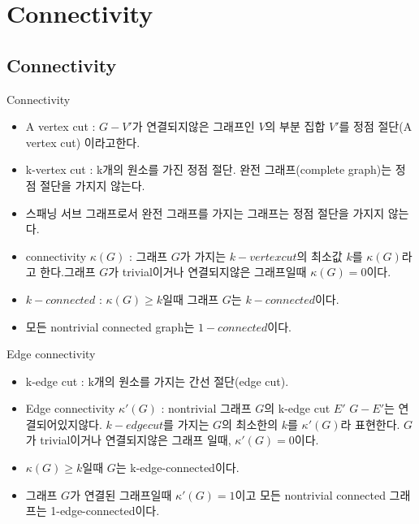\section{Connectivity}

\subsection{Connectivity}

\begin{dfn}[Connectivity] 
    Connectivity
    \begin{itemize}
        \item A vertex cut : $G-V'$가 연결되지않은 그래프인 $V$의 부분 집합 $V'$를 정점 절단(A vertex cut) 이라고한다.
        \item k-vertex cut : k개의 원소를 가진 정점 절단. 완전 그래프(complete graph)는 정점 절단을 가지지 않는다.
        \item 스패닝 서브 그래프로서 완전 그래프를 가지는 그래프는 정점 절단을 가지지 않는다.
        \item  connectivity $\kappa(G)$ : 그래프 $G$가 가지는 $k-vertex cut$의 최소값 $k$를 $\kappa(G)$라고 한다.그래프 $G$가 trivial이거나 연결되지않은 그래프일때 $\kappa(G) = 0$이다.
        \item $k-connected$ :  $\kappa(G) \ge k$일때 그래프 $G$는 $k-connected$이다. 
        \item 모든 nontrivial connected graph는 $1-connected$이다.
    \end{itemize}
\end{dfn}

\begin{dfn}
    Edge connectivity 
    \begin{itemize}
        \item k-edge cut : k개의 원소를 가지는 간선 절단(edge cut).
        \item Edge connectivity $\kappa'(G)$ : nontrivial 그래프 $G$의 k-edge cut $E'$ $G-E'$는 연결되어있지않다. $k-edge cut$를 가지는 $G$의 최소한의 $k$를 $\kappa'(G)$라 표현한다. $G$가 trivial이거나 연결되지않은 그래프 일때, $\kappa'(G) = 0$이다.
        \item $\kappa(G) \ge k$일때 $G$는 k-edge-connected이다.
        \item 그래프 $G$가 연결된 그래프일때  $\kappa'(G)= 1$이고 모든 nontrivial connected 그래프는 1-edge-connected이다.
    \end{itemize}
\end{dfn}


